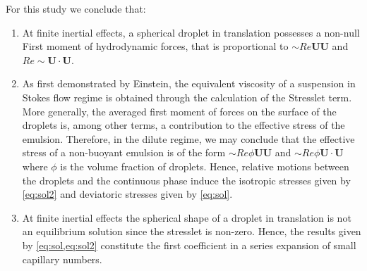 For this study we conclude that: 
\begin{enumerate}
    \item 
    At finite inertial effects, a spherical droplet in translation possesses a non-null First moment of hydrodynamic forces, that is proportional to $\sim Re \textbf{UU}$ and $Re\sim \textbf{U}\cdot\textbf{U}$. 
    \item 
    As first demonstrated by Einstein, the equivalent viscosity of a suspension in Stokes flow regime is obtained through the calculation of the Stresslet term. 
    More generally, the averaged first moment of forces on the surface of the droplets is, among other terms, a contribution to the effective stress of the emulsion. 
    Therefore, in the dilute regime, we may conclude that the effective stress of a non-buoyant emulsion is of the form $\sim Re \phi \textbf{UU}$ and $\sim Re \phi \textbf{U}\cdot \textbf{U}$ where $\phi$ is the volume fraction of droplets.
    Hence, relative motions between the droplets and the continuous phase induce the isotropic stresses given by \ref{eq:sol2} and deviatoric stresses given by \ref{eq:sol}. 
    \item At finite inertial effects the spherical shape of a droplet in translation is not an equilibrium solution since the stresslet is non-zero. 
    Hence, the results given by \ref{eq:sol,eq:sol2} constitute the first coefficient in a series expansion of small capillary numbers. 
\end{enumerate}